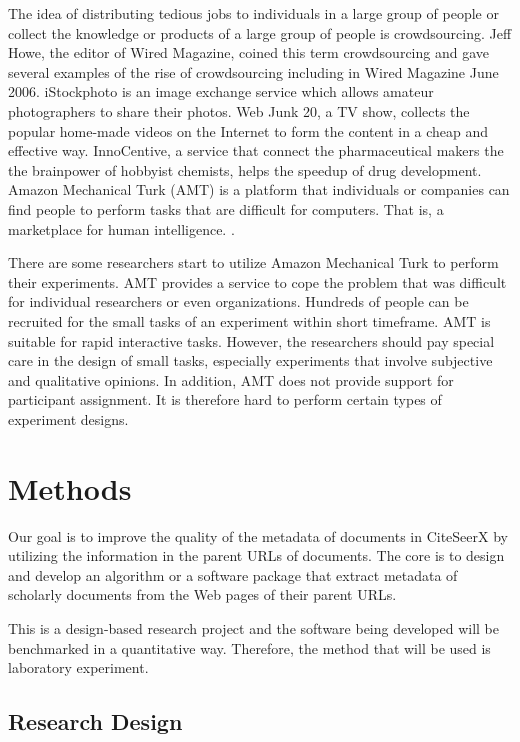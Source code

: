 \documentclass[prodmode]{acmsmall} %
\begin{document}
The idea of distributing tedious jobs to individuals in a large group of people or collect the knowledge or products of a large group of people is crowdsourcing. Jeff Howe, the editor of Wired Magazine, coined this term crowdsourcing and gave several examples of the rise of crowdsourcing including in Wired Magazine June 2006. iStockphoto is an image exchange service which allows amateur photographers to share their photos. Web Junk 20, a TV show, collects the popular home-made videos on the Internet to form the content in a cheap and effective way. InnoCentive, a service that connect the pharmaceutical makers the the brainpower of hobbyist chemists, helps the speedup of drug development. Amazon Mechanical Turk (AMT) is a platform that individuals or companies can find people to perform tasks that are difficult for computers. That is, a marketplace for human intelligence. \cite{howe2006rise}.

There are some researchers start to utilize Amazon Mechanical Turk to perform their experiments. AMT provides a service to cope the problem that was difficult for individual researchers or even organizations. Hundreds of people can be recruited for the small tasks of an experiment within short timeframe. AMT is suitable for rapid interactive tasks. However, the researchers should pay special care in the design of small tasks, especially experiments that involve subjective and qualitative opinions. In addition, AMT does not provide support for participant assignment. It is therefore hard to perform certain types of experiment designs. \cite{kittur2008crowdsourcing}

\section{Methods}

Our goal is to improve the quality of the metadata of documents in CiteSeerX by utilizing the information in the parent URLs of documents. The core is to design and develop an algorithm or a software package that extract metadata of scholarly documents from the Web pages of their parent URLs.

This is a design-based research project and the software being developed will be benchmarked in a quantitative way. Therefore, the method that will be used is laboratory experiment.

\subsection{Research Design}
\end{document}
